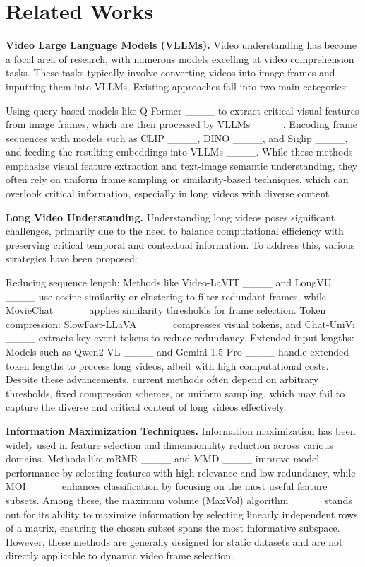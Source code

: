 \section{Related Works}
\textbf{Video Large Language Models (VLLMs).}
Video understanding has become a focal area of research, with numerous models excelling at video comprehension tasks. These tasks typically involve converting videos into image frames and inputting them into VLLMs. Existing approaches fall into two main categories:

Using query-based models like Q-Former ____ to extract critical visual features from image frames, which are then processed by VLLMs ____.
Encoding frame sequences with models such as CLIP ____, DINO ____, and Siglip ____, and feeding the resulting embeddings into VLLMs ____.
While these methods emphasize visual feature extraction and text-image semantic understanding, they often rely on uniform frame sampling or similarity-based techniques, which can overlook critical information, especially in long videos with diverse content.

\textbf{Long Video Understanding.}
Understanding long videos poses significant challenges, primarily due to the need to balance computational efficiency with preserving critical temporal and contextual information. To address this, various strategies have been proposed:

Reducing sequence length: Methods like Video-LaVIT ____ and LongVU ____ use cosine similarity or clustering to filter redundant frames, while MovieChat ____ applies similarity thresholds for frame selection.
Token compression: SlowFast-LLaVA ____ compresses visual tokens, and Chat-UniVi ____ extracts key event tokens to reduce redundancy.
Extended input lengths: Models such as Qwen2-VL ____ and Gemini 1.5 Pro ____ handle extended token lengths to process long videos, albeit with high computational costs.
Despite these advancements, current methods often depend on arbitrary thresholds, fixed compression schemes, or uniform sampling, which may fail to capture the diverse and critical content of long videos effectively.

\textbf{Information Maximization Techniques.}
Information maximization has been widely used in feature selection and dimensionality reduction across various domains. Methods like mRMR ____ and MMD ____ improve model performance by selecting features with high relevance and low redundancy, while MOI ____ enhances classification by focusing on the most useful feature subsets. Among these, the maximum volume (MaxVol) algorithm ____ stands out for its ability to maximize information by selecting linearly independent rows of a matrix, ensuring the chosen subset spans the most informative subspace. However, these methods are generally designed for static datasets and are not directly applicable to dynamic video frame selection.


